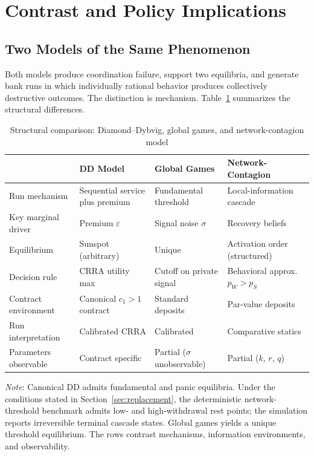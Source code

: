 \documentclass[12pt]{article}\usepackage[]{graphicx}\usepackage[]{xcolor}
\begin{document}
\section{Contrast and Policy Implications}
\label{sec:policy}

\subsection{Two Models of the Same Phenomenon}

Both models produce coordination failure, support two equilibria, and generate bank runs in which individually rational 
behavior produces collectively destructive outcomes.
The distinction is mechanism.
Table~\ref{tab:contrast} summarizes the structural differences.

\begin{table}[ht]
\centering
\caption{Structural comparison: Diamond--Dybvig, global games,
  and network-contagion model}
\label{tab:contrast}
\small
\begin{tabular}{lp{2.4cm}p{2.4cm}p{2.6cm}}
\hline\hline
 & DD Model & Global Games & Network-Contagion \\
\hline
Run mechanism        & Sequential service plus premium & Fundamental threshold       & Local-information cascade \\
Key marginal driver  & Premium $\varepsilon$     & Signal noise $\sigma$       & Recovery beliefs \\
Equilibrium          & Sunspot (arbitrary)       & Unique                      & Activation order (structured) \\
Decision rule        & CRRA utility max          & Cutoff on private signal    & Behavioral approx.\ $p_W\!>\!p_S$ \\
Contract environment & Canonical $c_1>1$ contract & Standard deposits          & Par-value deposits \\
Run interpretation   & Calibrated CRRA           & Calibrated                  & Comparative statics \\
Parameters observable& Contract specific         & Partial ($\sigma$ unobservable) & Partial ($k$, $r$, $q$) \\
\hline\hline
\end{tabular}
\smallskip

\small\textit{Note}: Canonical DD admits fundamental and panic
equilibria. Under the conditions stated in
Section~\ref{sec:replacement}, the deterministic network-threshold
benchmark admits low- and high-withdrawal rest points; the simulation
reports irreversible terminal cascade states. Global games yields a
unique threshold equilibrium. The rows contrast mechanisms,
information environments, and observability.
\end{table}
\end{document}
